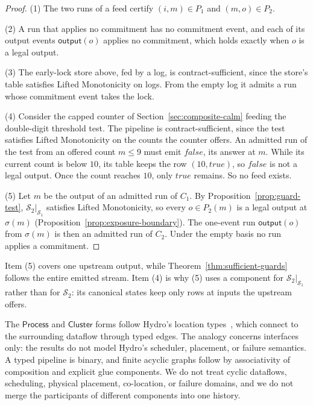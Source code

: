 \documentclass[sigconf]{cidr-2027}
\theoremstyle{remark}
\newcommand{\commitment}{commitment\xspace}
\newcommand{\Spec}{\mathcal{S}}
\begin{document}
\begin{proof}
(1) The two runs of a feed certify $(i,m)\in P_1$ and $(m,o)\in P_2$.

(2) A run that applies no \commitment has no \commitment event, and each of its
output events $\mathsf{output}(o)$ applies no \commitment, which holds exactly
when $o$ is a legal output.

(3) The early-lock store above, fed by a log, is contract-sufficient, since the
store's table satisfies Lifted Monotonicity on logs. From the empty log it
admits a run whose \commitment event takes the lock.

(4) Consider the capped counter of Section~\ref{sec:composite-calm} feeding
the double-digit threshold test. The pipeline is contract-sufficient, since the
test satisfies Lifted Monotonicity on the counts the counter offers. An
admitted run of the test from an offered count $m\le 9$ must emit
$\mathit{false}$, its answer at $m$. While its current count is below $10$,
its table keeps the row $(10,\mathit{true})$, so $\mathit{false}$ is not a
legal output. Once the count reaches $10$, only $\mathit{true}$ remains. So
no feed exists.

(5) Let $m$ be the output of an admitted run of $C_1$. By Proposition~\ref{prop:guard-test}, $\Spec_2|_{\Spec_1}$ satisfies
Lifted Monotonicity, so every $o\in P_2(m)$ is a legal output at $\sigma(m)$
(Proposition~\ref{prop:exposure-boundary}). The one-event run
$\mathsf{output}(o)$ from $\sigma(m)$ is then an admitted run of $C_2$. Under the empty basis no run applies a \commitment.
\end{proof}

Item (5) covers one upstream output, while
Theorem~\ref{thm:sufficient-guards} follows the entire emitted stream. Item (4) is why (5) uses a component for $\Spec_2|_{\Spec_1}$ rather than for
$\Spec_2$: its canonical states keep only rows at inputs the upstream offers.

The $\mathsf{Process}$ and $\mathsf{Cluster}$ forms follow Hydro's location
types~\cite{hydro}, which connect to the surrounding dataflow through typed
edges. The analogy concerns interfaces only: the results do not model
Hydro's scheduler, placement, or failure semantics. A typed pipeline is
binary, and finite acyclic graphs follow by associativity of composition and
explicit glue components. We do not treat cyclic dataflows, scheduling,
physical placement, co-location, or failure domains, and we do not merge the
participants of different components into one history.
\end{document}
